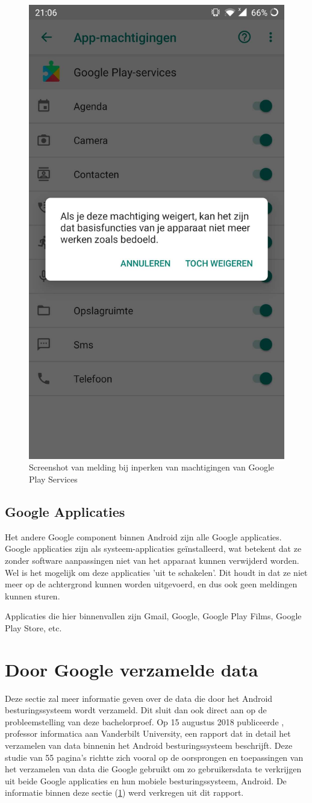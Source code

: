 \begin{figure}
    \centering
    \includegraphics[width=0.4\linewidth]{img/machtigingen_melding.jpg}
    \caption{Screenshot van melding bij inperken van machtigingen van Google Play Services}
    \label{fig:permissions2}
\end{figure}

\subsection{Google Applicaties}
Het andere Google component binnen Android zijn alle Google applicaties. Google applicaties zijn als systeem-applicaties geïnstalleerd, wat betekent dat ze zonder software aanpassingen niet van  het apparaat kunnen verwijderd worden. Wel is het mogelijk om deze applicaties 'uit te schakelen'. Dit houdt in dat ze niet meer op de achtergrond kunnen worden uitgevoerd, en dus ook geen meldingen kunnen sturen.

Applicaties die hier binnenvallen zijn Gmail, Google, Google Play Films, Google Play Store, etc.

\section{Door Google verzamelde data}
\label{collected_data}

Deze sectie zal meer informatie geven over de data die door het Android besturingssysteem wordt verzameld. Dit sluit dan ook direct aan op de probleemstelling van deze bachelorproef. Op 15 augustus 2018 publiceerde \textcite{schmidt_google-data-collection}, professor informatica aan Vanderbilt University, een rapport dat in detail het verzamelen van data binnenin het Android besturingssysteem beschrijft. Deze studie van 55 pagina's richtte zich vooral op de oorsprongen en toepassingen van het verzamelen van data die Google gebruikt om zo gebruikersdata te verkrijgen uit beide Google applicaties en hun mobiele besturingssysteem, Android. De informatie binnen deze sectie (\ref{collected_data}) werd verkregen uit dit rapport.

